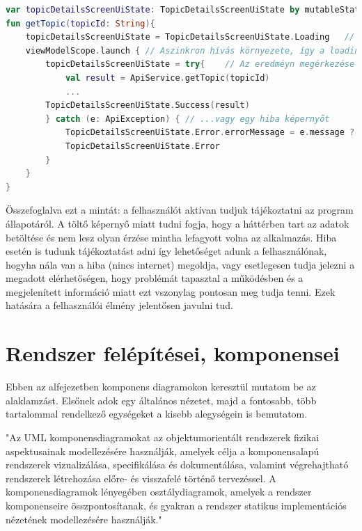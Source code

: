 \begin{lstlisting}[caption={UiState beállítása}, label={lst:UiStateSetting}, language=Kotlin]
var topicDetailsScreenUiState: TopicDetailsScreenUiState by mutableStateOf(TopicDetailsScreenUiState.Loading) // State alap loading értékkel
fun getTopic(topicId: String){
    topicDetailsScreenUiState = TopicDetailsScreenUiState.Loading   // Ha nem lenne beállítva beállítjuk a loadingot
    viewModelScope.launch { // Aszinkron hívás környezete, így a loading animációt nemblokkoljuk
        topicDetailsScreenUiState = try{    // Az eredméyn megérkezése után vagy mutatjuk az adatot...
            val result = ApiService.getTopic(topicId)
            ...
        TopicDetailsScreenUiState.Success(result)
        } catch (e: ApiException) { // ...vagy egy hiba képernyőt
            TopicDetailsScreenUiState.Error.errorMessage = e.message ?: "Unkown error"
            TopicDetailsScreenUiState.Error
        } 
    }
}
\end{lstlisting}

Összefoglalva ezt a mintát: a felhasználót aktívan tudjuk tájékoztatni az program állapotáról.
A töltő képernyő miatt tudni fogja, hogy a háttérben tart az adatok betöltése és nem lesz olyan érzése mintha lefagyott volna az alkalmazás.
Hiba esetén is tudunk tájékoztatást adni így lehetőséget adunk a felhasználónak, hogyha nála van a hiba (nincs internet) megoldja, vagy esetlegesen tudja jelezni a megadott elérhetőségen, hogy problémát tapasztal a működésben és a megjelenített információ miatt ezt vszonylag pontosan meg tudja tenni.
Ezek hatására a felhasználói élmény jelentősen javulni tud.

\section{Rendszer felépítései, komponensei}
\label{sec:Components}

Ebben az alfejezetben komponens diagramokon keresztül mutatom be az alaklamzást.
Elsőnek adok egy általános nézetet, majd a fontosabb, több tartalommal rendelkező egységeket a kisebb alegységein is bemutatom.

"Az UML komponensdiagramokat az objektumorientált rendszerek fizikai aspektusainak modellezésére használják, amelyek célja a komponensalapú rendszerek vizualizálása, specifikálása és dokumentálása, valamint végrehajtható rendszerek létrehozása előre- és visszafelé történő tervezéssel. A komponensdiagramok lényegében osztálydiagramok, amelyek a rendszer komponenseire összpontosítanak, és gyakran a rendszer statikus implementációs nézetének modellezésére használják." \cite{ComponentDiagram}

